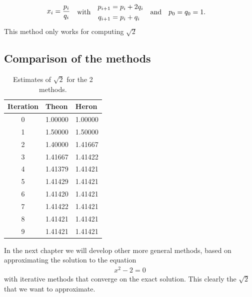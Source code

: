 \[
	\begin{aligned}
	x_i = \frac{p_i}{q_i}
	\end{aligned}
	\quad {\rm with} \quad
	\begin{aligned}
	p_{i+1} &= p_i + 2 q_i \\
	q_{i+1} &= p_i + q_i
	\end{aligned}
	\quad {\rm and}  \quad
	\begin{aligned}
	p_0 &= q_0 = 1.
	\end{aligned}
\]
This method only works for computing $\sqrt{2}$


\subsection{Comparison of the methods}


\begin{table}[H]
\begin{center}
\begin{tabular}{c l l}
Iteration & Theon & Heron \\ \hline
0 & 1.00000 & 1.00000 \\
1 & 1.50000 & 1.50000 \\
2 & 1.40000 & 1.41667 \\
3 & 1.41667 & 1.41422 \\
4 & 1.41379 & 1.41421 \\
5 & 1.41429 & 1.41421 \\
6 & 1.41420 & 1.41421 \\
7 & 1.41422 & 1.41421 \\
8 & 1.41421 & 1.41421 \\
9 & 1.41421 & 1.41421 \\
\end{tabular}
\end{center}
\caption{Estimates of $\sqrt{2}$ for the 2 methods.}
\label{tab:taylor_sqrt2}
\end{table}

In the next chapter we will develop other more general methods, based on approximating the solution to the equation
\begin{align*}
x^2 - 2 = 0
\end{align*}
with iterative methods that converge on the exact solution. This clearly the $\sqrt{2}$ that we want to approximate.

